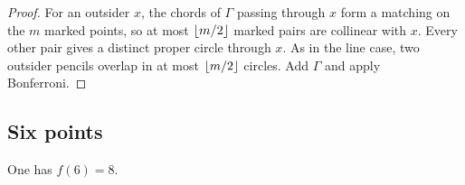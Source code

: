 \begin{proof}
For an outsider $x$, the chords of $\Gamma$ passing through $x$ form a
matching on the $m$ marked points, so at most $\left\lfloor m/2\right\rfloor$ marked pairs are
collinear with $x$.  Every other pair gives a distinct proper circle through
$x$.  As in the line case, two outsider pencils overlap in at most
$\left\lfloor m/2\right\rfloor$ circles.  Add $\Gamma$ and apply Bonferroni.
\end{proof}

\subsection{Six points}

\begin{proposition}\label{prop:n6}
One has $f(6)=8$.
\end{proposition}

